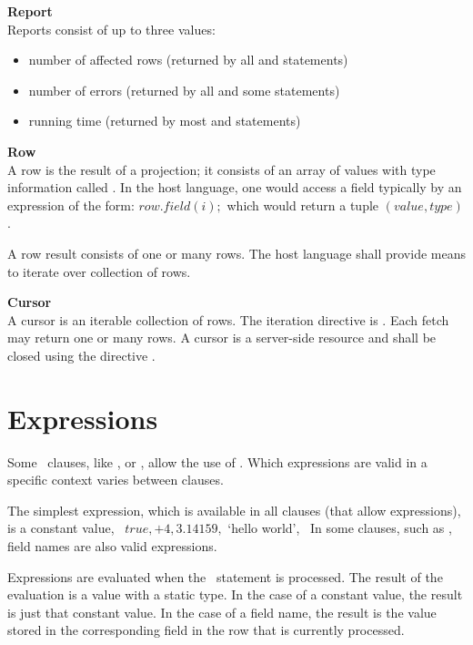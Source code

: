 \begin{minipage}{\textwidth}
\textbf{Report}\\
Reports consist of up to three values:
\begin{itemize}
\item number of affected rows
(returned by all  and  statements)
\item number of errors
(returned by all  and some  statements)
\item running time
(returned by most  and  statements)
\end{itemize}
\end{minipage}

\begin{minipage}{\textwidth}
\textbf{Row}\\
A row is the result of a projection;
it consists of an array of values
with type information called .
In the host language, one would access a field
typically by an expression of the form:
$row.field(i);$
which would return a tuple $(value,type)$.

A row result consists of one or many rows.
The host language shall provide means
to iterate over collection of rows.
\end{minipage}

\begin{minipage}{\textwidth}
\textbf{Cursor}\\
A cursor is an iterable collection of rows.
The iteration directive is .
Each fetch may return one or many rows.
A cursor is a server-side resource
and shall be closed using the directive .
\end{minipage}

\section{Expressions}
Some \sql\ clauses, like , 
 or ,
allow the use of .
Which expressions are valid 
in a specific context varies between
clauses.

The simplest expression,
which is available in all clauses
(that allow expressions),
is a constant value,
\eg\ $true, +4, 3.14159,$ `hello world', \etc\
In some clauses, such as ,
field names are also valid expressions.

Expressions are evaluated when the
\sql\ statement is processed.
The result of the evaluation is
a value with a static type.
In the case of a constant value,
the result is just that constant value.
In the case of a field name,
the result is the value stored in
the corresponding field in the
row that is currently processed.

